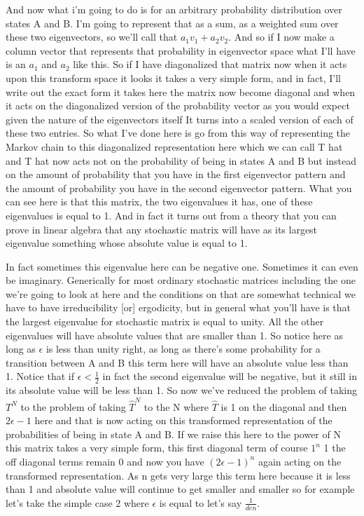 \documentclass[]{article}
\begin{document}
And now what i'm going to do is for an arbitrary
probability distribution over states
A and B. I'm going to represent that
as a sum,
as a weighted sum over these two eigenvectors,
so we'll call that $a_1v_1 + a_2v_2$.
And so if I now make a column vector
that represents that probability
in eigenvector space
what I'll have is an $a_1$ and $a_2$ like this.
So if I have diagonalized
that matrix now
when it acts upon
this transform space
it looks it takes a very simple form,
and in fact, I'll write out
the exact form it takes here
the matrix now become diagonal
and when it acts
on the diagonalized version
of the probability vector
as you would expect
given the nature of
the eigenvectors itself
It turns into
a scaled version of
each of these two entries.
So what I've done here is go from
this way of representing
the Markov chain
to this diagonalized representation here
which we can call T hat
and T hat now acts not on the
probability of being in states A and B
but instead on the amount
of probability that you have
in the first eigenvector pattern
and the amount of probability you have
in the second eigenvector pattern.
What you can see here is that this matrix,
the two eigenvalues it has,
one of these eigenvalues is equal to 1.
And in fact it turns out from a theory
that you can prove in linear algebra
that any stochastic matrix
will have as its largest eigenvalue
something whose
absolute value is equal to 1.

In fact sometimes this eigenvalue here
can be negative one.
Sometimes it can even be imaginary.
Generically for most ordinary
stochastic matrices
including the one we're going to look at here
and the conditions on that
are somewhat technical
we have to have irreducibility [or] ergodicity,
but in general what you'll have
is that the largest eigenvalue
for stochastic matrix is equal to unity.
All the other eigenvalues
will have absolute values
that are smaller than 1.
So notice here as long as $\epsilon$
 is less than unity
right, as long as there's some probability
for a transition between A and B
this term here will have
an absolute value less than 1.
Notice that if $\epsilon<\frac{1}{2}$ in fact
the second eigenvalue will be negative,
but it still in its absolute value
will be less than 1.
So now we've reduced the problem
of taking $T^N$
to the problem of taking $\widehat{T}^N$ to the N
where $\widehat{T}$ is 1 on the diagonal
and then $2\epsilon-1$ here
and that is now acting
on this transformed representation of the
probabilities of being in state A and B.
If we raise this here to the power of N
this matrix takes a very simple form,
this first diagonal term
of course $1^n$ 1
the off diagonal terms remain 0
and now you have $(2\epsilon-1)^n$ 
again acting on
the transformed representation.
As n gets very large this term here
because it is less than 1 and
absolute value
will continue to get smaller and smaller
so for example let's take
the simple case 2
where $\epsilon$ is equal to let's say $\frac{1}{den}$.
\end{document}
